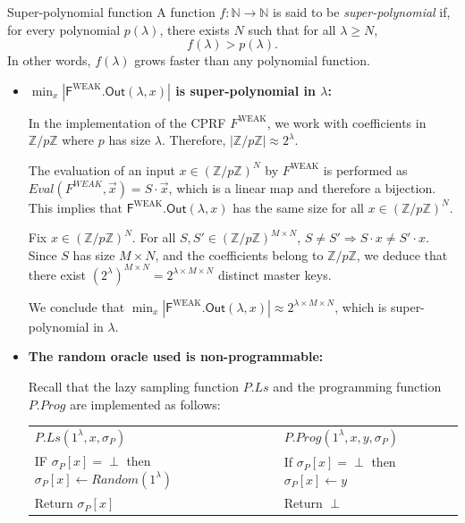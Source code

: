 \documentclass[9pt]{extarticle}
\begin{document}
\begin{defbox}{Super-polynomial function}
A function $f : \mathbb{N} \rightarrow \mathbb{N}$ is said to be \emph{super-polynomial} if, for every polynomial $p(\lambda)$, there exists $N$ such that for all $\lambda \geq N$,
\[
f(\lambda) > p(\lambda).
\]
In other words, $f(\lambda)$ grows faster than any polynomial function.
\end{defbox}

\begin{itemize}
\item \textbf{$\min_x |\textsf{F}^{\text{WEAK}}\textsf{.Out}(\lambda, x)|$ is super-polynomial in $\lambda$:}

In the implementation of the CPRF $F^{\text{WEAK}}$, we work with coefficients in $\mathbb{Z}/p\mathbb{Z}$ where $p$ has size $\lambda$. Therefore, $|\mathbb{Z}/p\mathbb{Z}| \approx 2^{\lambda}$.

The evaluation of an input $x \in (\mathbb{Z}/p\mathbb{Z})^N$ by $F^{\text{WEAK}}$ is performed as $Eval(F^{WEAK},\vec{x}) = S \cdot \vec{x}$, which is a linear map and therefore a bijection. This implies that $\textsf{F}^{\text{WEAK}}\textsf{.Out}(\lambda, x)$ has the same size for all $x \in (\mathbb{Z}/p\mathbb{Z})^N$.

Fix $x \in (\mathbb{Z}/p\mathbb{Z})^N$. For all $S,S' \in (\mathbb{Z}/p\mathbb{Z})^{M \times N}$, $S \neq S' \Rightarrow S \cdot x \neq S' \cdot x$. Since $S$ has size $M \times N$, and the coefficients belong to $\mathbb{Z}/p\mathbb{Z}$, we deduce that there exist $(2^{\lambda})^{M \times N} = 2^{\lambda \times M \times N}$ distinct master keys.

We conclude that $\min_x |\textsf{F}^{\text{WEAK}}\textsf{.Out}(\lambda, x)| \approx 2^{\lambda \times M \times N}$, which is super-polynomial in $\lambda$.

\item \textbf{The random oracle used is non-programmable:}

Recall that the lazy sampling function $P.Ls$ and the programming function $P.Prog$ are implemented as follows:

\begin{center}
  \begin{tabular}{l|l}
    \textbf{\underline{$P.Ls(1^{\lambda}, x, \sigma_P)$}} & \textbf{\underline{$P.Prog(1^{\lambda}, x, y, \sigma_P)$}} \\
    IF $\sigma_P[x] = \perp$ then $\sigma_P[x] \leftarrow Random(1^{\lambda})$ & If $\sigma_P[x] = \perp$ then $\sigma_P[x] \leftarrow y$ \\
    Return $\sigma_P[x]$ & Return $\perp$
  \end{tabular}
\end{center}


\end{itemize}
\end{document}
